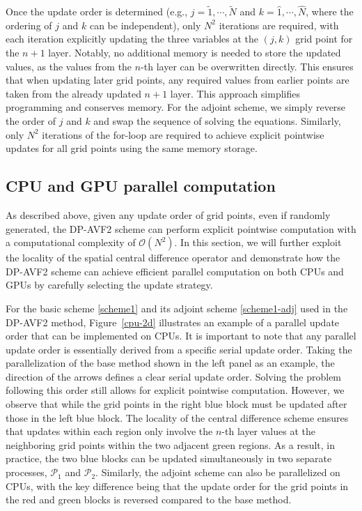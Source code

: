 \documentclass[fleqn,11pt]{elsarticle}
\numberwithin{equation}{section}
\begin{document}
Once the update order is determined (e.g., $ j = \widetilde{1}, \cdots, \widetilde{N} $ and $ k = \widehat{1}, \cdots, \widehat{N} $, where the ordering of $ j $ and $ k $ can be independent), only $ N^2 $ iterations are required, with each iteration explicitly updating the three variables at the $(j, k)$ grid point for the $n+1$ layer. Notably, no additional memory is needed to store the updated values, as the values from the $n$-th layer can be overwritten directly. This ensures that when updating later grid points, any required values from earlier points are taken from the already updated $n+1$ layer. This approach simplifies programming and conserves memory. For the adjoint scheme, we simply reverse the order of $j$ and $k$ and swap the sequence of solving the equations. Similarly, only $N^2$ iterations of the for-loop are required to achieve explicit pointwise updates for all grid points using the same memory storage.



\subsection{CPU and GPU parallel computation}

As described above, given any update order of grid points, even if randomly generated, the DP-AVF2 scheme can perform explicit pointwise computation with a computational complexity of $\mathcal{O}(N^2)$. In this section, we will further exploit the locality of the spatial central difference operator and demonstrate how the DP-AVF2 scheme can achieve efficient parallel computation on both CPUs and GPUs by carefully selecting the update strategy.


For the basic scheme \eqref{scheme1} and its adjoint scheme \eqref{scheme1-adj} used in the DP-AVF2 method, Figure~\ref{cpu-2d} illustrates an example of a parallel update order that can be implemented on CPUs. It is important to note that any parallel update order is essentially derived from a specific serial update order. Taking the parallelization of the base method shown in the left panel as an example, the direction of the arrows defines a clear serial update order. Solving the problem following this order still allows for explicit pointwise computation. However, we observe that while the grid points in the right blue block must be updated after those in the left blue block. The locality of the central difference scheme ensures that updates within each region only involve the $n$-th layer values at the neighboring grid points within the two adjacent green regions. As a result, in practice, the two blue blocks can be updated simultaneously in two separate processes, $\mathcal{P}_1$ and $\mathcal{P}_2$. Similarly, the adjoint scheme can also be parallelized on CPUs, with the key difference being that the update order for the grid points in the red and green blocks is reversed compared to the base method.
\end{document}
